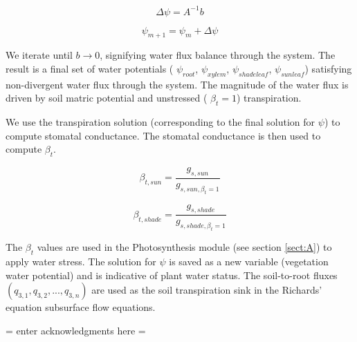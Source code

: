 \documentclass[draft,linenumbers]{agujournal}
\begin{document}
   \begin{linenomath*} \begin{equation} 
   \Delta\psi=A^{-1}b
   \end{equation} \end{linenomath*}

   \begin{linenomath*} \begin{equation} 
   \psi_{m+1}=\psi_m+\Delta\psi
   \end{equation} \end{linenomath*}

We iterate until $b\to 0$, signifying water flux balance through the system. The result is a final set of water potentials ( $\psi_{root}$, $\psi_{xylem}$, $\psi_{shadeleaf}$, $\psi_{sunleaf}$) satisfying non-divergent water flux through the system. 
The magnitude of the water flux is driven by soil matric potential and unstressed ( $\beta_t=1$) transpiration. 

We use the transpiration solution (corresponding to the final solution for $\psi$) to compute stomatal conductance. The stomatal conductance is then used to compute $\beta_t$. 

   \begin{linenomath*} \begin{equation} 
   \beta_{t,sun} = \dfrac{g_{s,sun}}{g_{s,sun,\beta_t=1}} 
   \end{equation} \end{linenomath*}

   \begin{linenomath*} \begin{equation} 
   \beta_{t,shade} = \dfrac{g_{s,shade}}{g_{s,shade,\beta_t=1}} 
   \end{equation} \end{linenomath*}

The $\beta_t$ values are used in the Photosynthesis module (see section \ref{sect:A}) to apply water stress. 
The solution for $\psi$ is saved as a new variable (vegetation water potential) and is indicative of plant water status.
The soil-to-root fluxes $\left( q_{3,1},q_{3,2},\text{...},q_{3,n}\right)$ are used as the soil transpiration sink in the Richards' equation subsurface flow equations.

\acknowledgments
 = enter acknowledgments here =


\nocite{*} 



\listofchanges
\end{document}
